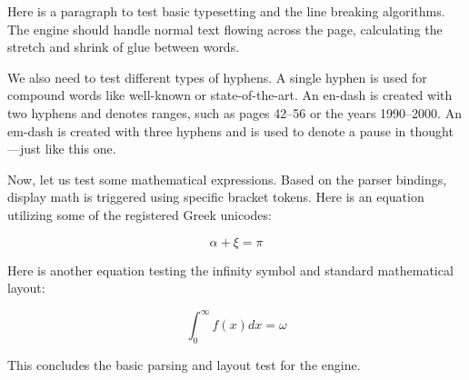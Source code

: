 \documentclass{article}
\begin{document}
Here is a paragraph to test basic typesetting and the line breaking algorithms. The engine should handle normal text flowing across the page, calculating the stretch and shrink of glue between words.

We also need to test different types of hyphens. A single hyphen is used for compound words like well-known or state-of-the-art. An en-dash is created with two hyphens and denotes ranges, such as pages 42--56 or the years 1990--2000. An em-dash is created with three hyphens and is used to denote a pause in thought---just like this one. 

Now, let us test some mathematical expressions. Based on the parser bindings, display math is triggered using specific bracket tokens. Here is an equation utilizing some of the registered Greek unicodes:

\[
\alpha + \xi = \pi
\]

Here is another equation testing the infinity symbol and standard mathematical layout:

\[
\int_{0}^{\infty} f(x) dx = \omega
\]

This concludes the basic parsing and layout test for the engine.
\end{document}
